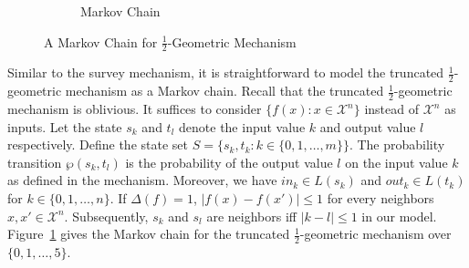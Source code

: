 \begin{figure}[tbh]
\begin{subfigure}{.50\columnwidth}
{
    }
    \caption{Markov Chain}
    \label{figure:geometric-mechanism-markov-chain}
  \end{subfigure}
  \caption{A Markov Chain for $\frac{1}{2}$-Geometric Mechanism}
  \label{figure:geometric-mechanism}\vspace*{-.5cm}
\end{figure}

Similar to the survey mechanism, it is straightforward to model the
truncated $\frac{1}{2}$-geometric mechanism as a Markov chain. 
Recall that the truncated $\frac{1}{2}$-geometric mechanism is
oblivious. It suffices to consider $\{ f (x) : x \in \mathcal{X}^n \}$
instead of $\mathcal{X}^n$ as inputs. 
Let the state $s_k$ and $t_l$
denote the input value $k$ and output value $l$ respectively. Define
the state set $S = \{ s_k, t_k : k \in \{ 0, 1, \ldots, m \} \}$.
The probability transition $\wp (s_k, t_l)$ is the probability of the
output value $l$ on the input value $k$ as defined in the
mechanism. Moreover, we have $\mathit{in}_k \in L (s_k)$ and
$\mathit{out}_k \in L (t_k)$ for $k \in \{ 0, 1, \ldots, n \}$.
If $\Delta (f) = 1$, $| f (x) - f (x') | \leq 1$ for every neighbors
$x, x' \in \mathcal{X}^n$. Subsequently, $s_k$ and $s_l$ are
neighbors iff $| k - l | \leq 1$ in our model.
Figure~\ref{figure:geometric-mechanism-markov-chain} gives
the Markov chain for the truncated
$\frac{1}{2}$-geometric mechanism over $\{ 0, 1, \ldots, 5 \}$.



